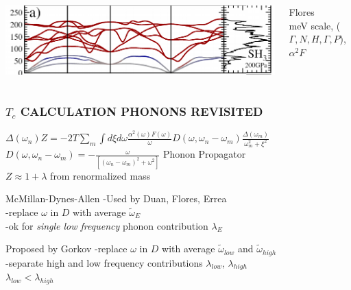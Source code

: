 \documentclass[amssymb,amsmath]{beamer}
\begin{document}
\begin{frame}
\begin{columns}\begin{column}{0.7\textwidth}
\includegraphics[scale=0.29]{./figures/phonons_flores.png}
\end{column}
\begin{column}{0.36\textwidth}
{\tiny Flores }\\
meV scale, ($\Gamma,N,H,\Gamma,P$), $\alpha^2 F$
\end{column}\end{columns}
\end{frame}
\begin{frame}
\frametitle{$T_c$ CALCULATION PHONONS REVISITED}
$\Delta(\omega_n)Z = -2T\sum\limits_{m}\int d\xi d\omega \frac{\alpha^2(\omega) F(\omega)}{\omega} D(\omega,\omega_n-\omega_m) \frac{\Delta(\omega_m)}{\omega_m^2 + \xi^2}$ \\
$D(\omega,\omega_n-\omega_m) = -\frac{\omega}{[(\omega_n-\omega_m)^2+\omega^2]}$ Phonon Propagator \\
$Z\approx 1+ \lambda$ from renormalized mass\\[1cm]
\begin{block}{McMillan-Dynes-Allen}
-Used by Duan, Flores, Errea \\
-replace $\omega$ in $D$ with average $\tilde{\omega}_E$ \\
-ok for \emph{single low frequency} phonon contribution $\lambda_E$
\end{block}

\begin{block}{Proposed by Gorkov}
-replace $\omega$ in $D$ with average $\tilde{\omega}_{low}$ and $\tilde{\omega}_{high}$ \\
-separate high and low frequency contributions $\lambda_{low}$, $\lambda_{high}$ \\
$\lambda_{low}<\lambda_{high}$
\end{block}
\end{frame}
\end{document}
